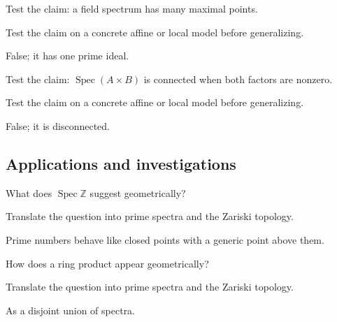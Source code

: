 \begin{exercise}\label{exr:vi07-expand-11}
Test the claim: a field spectrum has many maximal points.
\end{exercise}
\begin{hint}
Test the claim on a concrete affine or local model before generalizing.
\end{hint}
\begin{solution}
False; it has one prime ideal.
\end{solution}

\begin{exercise}\label{exr:vi07-expand-12}
Test the claim: $\operatorname{Spec}(A\times B)$ is connected when both factors are nonzero.
\end{exercise}
\begin{hint}
Test the claim on a concrete affine or local model before generalizing.
\end{hint}
\begin{solution}
False; it is disconnected.
\end{solution}

\subsection*{Applications and investigations}

\begin{exercise}\label{exr:vi07-expand-13}
What does $\operatorname{Spec}\mathbb Z$ suggest geometrically?
\end{exercise}
\begin{hint}
Translate the question into prime spectra and the Zariski topology.
\end{hint}
\begin{solution}
Prime numbers behave like closed points with a generic point above them.
\end{solution}

\begin{exercise}[Decomposition]\label{exr:vi07-expand-14}
How does a ring product appear geometrically?
\end{exercise}
\begin{hint}
Translate the question into prime spectra and the Zariski topology.
\end{hint}
\begin{solution}
As a disjoint union of spectra.
\end{solution}

